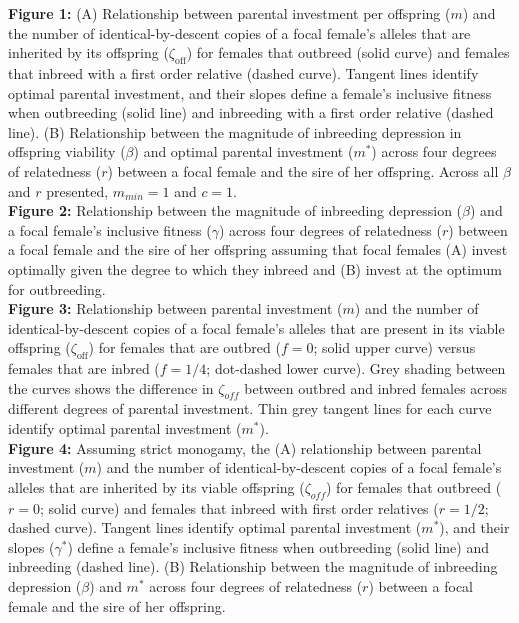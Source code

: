 \documentclass[12pt]{article}
\begin{document}
\noindent \textbf{Figure 1:} (A) Relationship between parental investment per offspring ($m$) and the number of identical-by-descent copies of a focal female's alleles that are inherited by its offspring ($\zeta_{\textrm{off}}$) for females that outbreed (solid curve) and females that inbreed with a first order relative (dashed curve). Tangent lines identify optimal parental investment, and their slopes define a female's inclusive fitness when outbreeding (solid line) and inbreeding with a first order relative (dashed line). (B) Relationship between the magnitude of inbreeding depression in offspring viability ($\beta$) and optimal parental investment ($m^{*}$) across four degrees of relatedness ($r$) between a focal female and the sire of her offspring. Across all $\beta$ and $r$ presented, $m_{min}=1$ and $c=1$. \\

\noindent \textbf{Figure 2:} Relationship between the magnitude of inbreeding depression ($\beta$) and a focal female's inclusive fitness ($\gamma$) across four degrees of relatedness ($r$) between a focal female and the sire of her offspring assuming that focal females (A) invest optimally given the degree to which they inbreed and (B) invest at the optimum for outbreeding. \\

\noindent \textbf{Figure 3:} Relationship between parental investment ($m$) and the number of identical-by-descent copies of a focal female's alleles that are present in its viable offspring ($\zeta_{\textrm{off}}$) for females that are outbred ($f=0$; solid upper curve) versus females that are inbred ($f=1/4$; dot-dashed lower curve). Grey shading between the curves shows the difference in $\zeta_{off}$ between outbred and inbred females across different degrees of parental investment. Thin grey tangent lines for each curve identify optimal parental investment ($m^{*}$). \\

\noindent \textbf{Figure 4:} Assuming strict monogamy, the (A) relationship between parental investment ($m$) and the number of identical-by-descent copies of a focal female's alleles that are inherited by its viable offspring ($\zeta_{off}$) for females that outbreed ($r=0$; solid curve) and females that inbreed with first order relatives ($r=1/2$; dashed curve). Tangent lines identify optimal parental investment ($m^{*}$), and their slopes ($\gamma^{*}$) define a female's inclusive fitness when outbreeding (solid line) and inbreeding (dashed line). (B) Relationship between the magnitude of inbreeding depression ($\beta$) and $m^{*}$ across four degrees of relatedness ($r$) between a focal female and the sire of her offspring. \\
\end{document}
